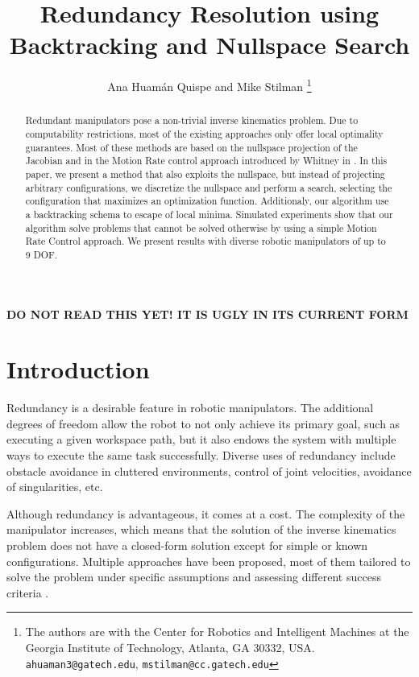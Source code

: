 \documentclass[conference]{IEEEtran}
\begin{document}
\title{Redundancy Resolution using Backtracking and Nullspace Search}
\author{Ana Huam\'an Quispe and Mike Stilman%
  \thanks{The authors are with the Center for Robotics and Intelligent
    Machines at the Georgia Institute of Technology, Atlanta, GA
    30332, USA. {\tt\small ahuaman3@gatech.edu}, {\tt\small mstilman@cc.gatech.edu}}}
\maketitle

\textbf{ DO NOT READ THIS YET! IT IS UGLY IN ITS CURRENT FORM }
\begin{abstract}
Redundant manipulators pose a non-trivial inverse kinematics problem.
Due to computability restrictions, most of the existing approaches only offer
local optimality guarantees. Most of these methods are based on the nullspace 
projection of the Jacobian and in the Motion Rate control approach introduced 
by Whitney in \cite{Whitney-motionRate-1969}. In this paper, we present a method that also exploits
the nullspace, but instead of projecting arbitrary configurations, we discretize
the nullspace and perform a search, selecting the configuration that maximizes
an optimization function. Additionaly, our algorithm use a backtracking schema 
to escape of local minima. Simulated experiments show that our algorithm solve
problems that cannot be solved otherwise by using a simple Motion Rate Control approach.
We present results with diverse robotic manipulators of up to 9 DOF.  
\end{abstract}

\section{Introduction}
Redundancy is a desirable feature in robotic manipulators. The 
additional degrees of freedom allow the robot to not only achieve
its primary goal, such as executing a given workspace path, but 
it also endows the system with multiple ways to execute the same 
task successfully. Diverse uses of redundancy include obstacle 
avoidance in cluttered environments, control of joint velocities,
avoidance of singularities, etc.

Although redundancy is advantageous, it comes at a
 cost. The complexity of the manipulator increases, which means
that the solution of the inverse kinematics problem does not have
a closed-form solution except for simple or known configurations.
Multiple approaches have been proposed, most of them tailored to
solve the problem under specific assumptions and assessing different
success criteria \cite{hooper-ns-1995}. 
\end{document}
